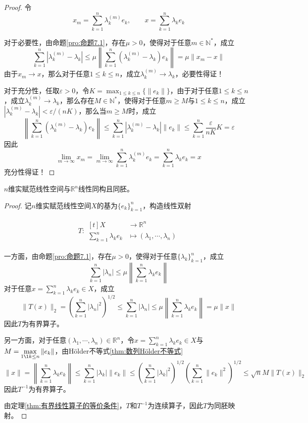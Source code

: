 \documentclass[lang = cn, scheme = chinese, thmcnt = section]{elegantbook}
\newcommand{\N}{\mathbb{N}}            %
\newcommand{\R}{\mathbb{R}}            %
\newcommand{\function}[5]{
	\begin{align*}
		#1:\begin{aligned}[t]
			#2 &\longrightarrow #3\\
			#4 &\longmapsto #5
		\end{aligned}
	\end{align*}
}                                     %
\begin{document}
\begin{proof}
	令
	$$
	x_m=\sum_{k=1}^{n}\lambda_k^{(m)}e_k,\qquad 
	x= \sum_{k=1}^{n}\lambda_ke_k
	$$
	
	对于必要性，由命题\ref{pro:命题7.1}，存在$\mu>0$，使得对于任意$m\in\N^*$，成立
	$$
	\sum_{k=1}^{n}|\lambda_k^{(m)}-\lambda_k|
	\le \mu\left\| \sum_{k=1}^{n}(\lambda_k^{(m)}-\lambda_k)e_k \right\|
	= \mu\|x_m-x\|
	$$
	由于$x_m\to x$，那么对于任意$1\le k\le n$，成立$\lambda_k^{(m)}\to \lambda_k$，必要性得证！
	
	对于充分性，任取$\varepsilon>0$，令$\displaystyle K=\max_{1\le k\le n}\{\| e_k \|\}$，由于对于任意$1\le k\le n$，成立$\lambda_k^{(m)}\to \lambda_k$，那么存在$M\in\N^*$，使得对于任意$m\ge M$与$1\le k\le n$，成立$|\lambda_k^{(m)}-\lambda_k|<\varepsilon/(nK)$，那么当$m\ge M$时，成立
	$$
	\left\| \sum_{k=1}^{n}(\lambda_k^{(m)}-\lambda_k)e_k \right\|
	\le \sum_{k=1}^{n}|\lambda_k^{(m)}-\lambda_k|\|e_k\|
	\le \sum_{k=1}^{n}\frac{\varepsilon}{nK}K=\varepsilon
	$$
	因此
	$$
	\lim_{m\to\infty}x_m=\lim_{m\to\infty}\sum_{k=1}^{n}\lambda_k^{(m)}e_k=\sum_{k=1}^{n}\lambda_ke_k=x
	$$
	充分性得证！
\end{proof}

\begin{theorem}
	$n$维实赋范线性空间与$\R^n$线性同构且同胚。
\end{theorem}

\begin{proof}
	记$n$维实赋范线性空间$X$的基为$\{e_k\}_{k=1}^{n}$，构造线性双射
	\function{T}{X}{\R^n}{\sum_{k=1}^{n}\lambda_ke_k}{(\lambda_1,\cdots,\lambda_n)}
	
	一方面，由命题\ref{pro:命题7.1}，存在$\mu>0$，使得对于任意$\{\lambda_k\}_{k=1}^{n}$，成立
	$$
	\sum_{k=1}^{n}|\lambda_n|\le\mu\left\| \sum_{k=1}^{n}\lambda_k e_k \right\|
	$$
	对于任意$\displaystyle x=\sum_{k=1}^{n}\lambda_k e_k\in X$，成立
	$$
	\|T(x)\|_2
	= \left(\sum_{k=1}^{n}|\lambda_n|^2\right)^{1/2}
	\le \sum_{k=1}^{n}|\lambda_n|
	\le \mu\left\| \sum_{k=1}^{n}\lambda_k e_k \right\|
	= \mu\|x\|
	$$
	因此$T$为有界算子。
	
	另一方面，对于任意$(\lambda_1,\cdots,\lambda_n)\in\R^n$，令$\displaystyle x=\sum_{k=1}^{n}\lambda_k e_k\in X$与$\displaystyle M=\max_{1\l k\le n}\|e_k\|$，由Hölder不等式\ref{thm:数列Hölder不等式}
	$$
	\|x\|
	= \left\| \sum_{k=1}^{n}\lambda_k e_k \right\|
	\le \sum_{k=1}^{n}|\lambda_k|\| e_k \|
	\le \left(\sum_{k=1}^{n}|\lambda_k|^2\right)^{1/2}\left(\sum_{k=1}^{n}\| e_k \|^2\right)^{1/2}
	\le \sqrt{n}M\|T(x)\|_2
	$$
	因此$T^{-1}$为有界算子。
	
	由定理\ref{thm:有界线性算子的等价条件}，$T$和$T^{-1}$为连续算子，因此$T$为同胚映射。
\end{proof}
\end{document}
